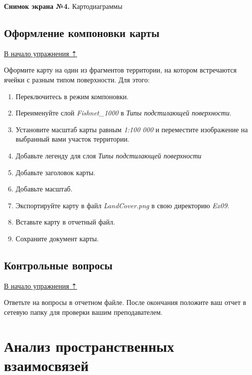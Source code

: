 \documentclass[]{book}
\theoremstyle{definition}
\theoremstyle{definition}
\theoremstyle{definition}
\theoremstyle{remark}
\begin{document}
\textbf{Снимок экрана №4.} Картодиаграммы

\hypertarget{land-cover-hydro-layout}{%
\section{Оформление компоновки карты}\label{land-cover-hydro-layout}}

\protect\hyperlink{land-cover-hydro}{В начало упражнения ⇡}

Оформите карту на один из фрагментов территории, на котором встречаются
ячейки с разным типом поверхности. Для этого:

\begin{enumerate}
\def\labelenumi{\arabic{enumi}.}
\item
  Переключитесь в режим компоновки.
\item
  Переименуйте слой \emph{Fishnet\_1000} в \emph{Типы подстилающей
  поверхности}.
\item
  Установите масштаб карты равным \emph{1:100 000} и переместите
  изображение на выбранный вами участок территории.
\item
  Добавьте легенду для слоя \emph{Типы подстилающей поверхности}
\item
  Добавьте заголовок карты.
\item
  Добавьте масштаб.
\item
  Экспортируйте карту в файл \emph{LandCover.png} в свою директорию
  \emph{Ex09}.
\item
  Вставьте карту в отчетный файл.
\item
  Сохраните документ карты.
\end{enumerate}

\hypertarget{land-cover-hydro-questions}{%
\section{Контрольные вопросы}\label{land-cover-hydro-questions}}

\protect\hyperlink{land-cover-hydro}{В начало упражнения ⇡}

Ответьте на вопросы в отчетном файле. После окончания положите ваш отчет
в сетевую папку для проверки вашим преподавателем.

\hypertarget{overlay}{%
\chapter{Анализ пространственных взаимосвязей}\label{overlay}}
\end{document}
